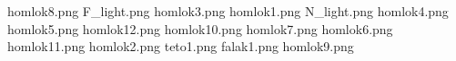 homlok8.png
F_light.png
homlok3.png
homlok1.png
N_light.png
homlok4.png
homlok5.png
homlok12.png
homlok10.png
homlok7.png
homlok6.png
homlok11.png
homlok2.png
teto1.png
falak1.png
homlok9.png
